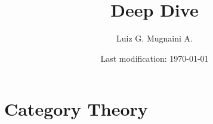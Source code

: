 

\newcommand{\onlyinsubfile}[1]{#1}
\newcommand{\notinsubfile}[1]{}

\author{Luiz G. Mugnaini A.}
\date{Last modification: \today}
\title{Deep Dive}



\renewcommand{\onlyinsubfile}[1]{}
\renewcommand{\notinsubfile}[1]{#1}

\frontmatter

% 
\maketitle

\tableofcontents
\listoftodos




\mainmatter


\part{Category Theory}

